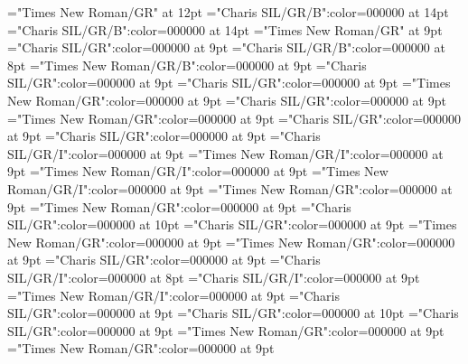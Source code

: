\documentclass[gps1,twoside]{article}
\begin{document}
\font\xitemtpi="Times New Roman/GR" at 12pt
\font{}="Charis SIL/GR/B":color=000000 at 14pt
\font{}="Charis SIL/GR/B":color=000000 at 14pt
\font{}="Times New Roman/GR" at 9pt
\font\entryletDatadicBody="Charis SIL/GR":color=000000 at 9pt
\font\headwordggoTeluINentryletDatadicBody="Charis SIL/GR/B":color=000000 at 8pt
\font\spanenheadwordggoTeluINentryletDatadicBody="Times New Roman/GR/B":color=000000 at 9pt
\font\pronunciationsentryletDatadicBody="Charis SIL/GR":color=000000 at 9pt
\font\pronunciationggofonipaxemicpronunciationsentryletDatadicBody="Charis SIL/GR":color=000000 at 9pt
\font\spanenpronunciationggofonipaxemicpronunciationsentryletDatadicBody="Times New Roman/GR":color=000000 at 9pt
\font\spanggofonipaxemicpronunciationggofonipaxemicpronunciationsentryletDatadicBody="Charis SIL/GR":color=000000 at 9pt
\font\spanenpronunciationsentryletDatadicBody="Times New Roman/GR":color=000000 at 9pt
\font\sensesentryletDatadicBody="Charis SIL/GR":color=000000 at 9pt
\font\sensesensesentryletDatadicBody="Charis SIL/GR":color=000000 at 9pt
\font\grammaticalinfosensesensesentryletDatadicBody="Charis SIL/GR/I":color=000000 at 9pt
\font\partofspeechengrammaticalinfosensesensesentryletDatadicBody="Times New Roman/GR/I":color=000000 at 9pt
\font\spanenpartofspeechengrammaticalinfosensesensesentryletDatadicBody="Times New Roman/GR/I":color=000000 at 9pt
\font\spanengrammaticalinfosensesensesentryletDatadicBody="Times New Roman/GR/I":color=000000 at 9pt
\font{}="Times New Roman/GR":color=000000 at 9pt
\font\spanendefinitionensensesensesentryletDatadicBody="Times New Roman/GR":color=000000 at 9pt
\font\LexSensepublishStemGlossPubLdtesensesensesentryletDatadicBody="Charis SIL/GR":color=000000 at 10pt
\font\spanteLexSensepublishStemGlossPubLdtesensesensesentryletDatadicBody="Charis SIL/GR":color=000000 at 9pt
\font\spanenLexSensepublishStemGlossPubLdtesensesensesentryletDatadicBody="Times New Roman/GR":color=000000 at 9pt
\font\spanensensesentryletDatadicBody="Times New Roman/GR":color=000000 at 9pt
\font\examplessensesensesentryletDatadicBody="Charis SIL/GR":color=000000 at 9pt
\font\exampleggoTeluINexamplessensesensesentryletDatadicBody="Charis SIL/GR/I":color=000000 at 8pt
\font\spanggoTeluINexampleggoTeluINexamplessensesensesentryletDatadicBody="Charis SIL/GR/I":color=000000 at 9pt
\font\spanenexampleggoTeluINexamplessensesensesentryletDatadicBody="Times New Roman/GR/I":color=000000 at 9pt
\font\translationsexamplessensesensesentryletDatadicBody="Charis SIL/GR":color=000000 at 9pt
\font\translationLdtetranslationsexamplessensesensesentryletDatadicBody="Charis SIL/GR":color=000000 at 10pt
\font\spantetranslationLdtetranslationsexamplessensesensesentryletDatadicBody="Charis SIL/GR":color=000000 at 9pt
\font\spanentranslationLdtetranslationsexamplessensesensesentryletDatadicBody="Times New Roman/GR":color=000000 at 9pt
\font\spanenexamplessensesensesentryletDatadicBody="Times New Roman/GR":color=000000 at 9pt
\end{document}
